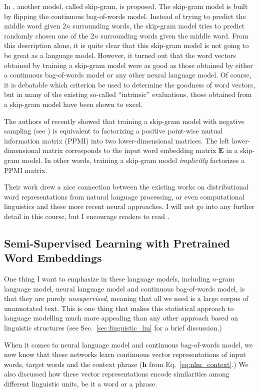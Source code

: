 \documentclass{report}
\newcommand{\vect}[1]{\mathbf{#1}}
\newcommand{\matr}[1]{\mathbf{#1}}
\newcommand{\vh}[0]{\vect{h}}
\newcommand{\mE}[0]{\matr{E}}
\begin{document}
In \cite{mikolov2013efficient}, another model, called skip-gram, is proposed.
The skip-gram model is built by flipping the continuous bag-of-words model.
Instead of trying to predict the middle word given $2n$ surrounding words, the
skip-gram model tries to predict randomly chosen one of the $2n$ surrounding
words given the middle word. From this description alone, it is quite clear that
this skip-gram model is not going to be great as a language model. However, it
turned out that the word vectors obtained by training a skip-gram model were as
good as those obtained by either a continuous bag-of-words model or any other
neural language model. Of course, it is debatable which criterion be used to
determine the goodness of word vectors, but in many of the existing so-called
``intrinsic'' evaluations, those obtained from a skip-gram model have been shown
to excel.

The authors of \cite{Omer2014} recently showed that training a skip-gram model
with negative sampling (see \cite{mikolov2013efficient}) is equivalent to
factorizing a positive point-wise mutual information matrix (PPMI) into two
lower-dimensional matrices. The left lower-dimensional matrix corresponds to the
input word embedding matrix $\mE$ in a skip-gram model. In other words, training
a skip-gram model {\em implicitly} factorizes a PPMI matrix. 

Their work drew a nice connection between the existing works on distributional word
representations from natural language processing, or even computational
linguistics and these more recent neural approaches. I will not go into any
further detail in this course, but I encourage readers to read \cite{Omer2014}.


\subsection{Semi-Supervised Learning with
Pretrained Word Embeddings}

One thing I want to emphasize in these language models, including $n$-gram
language model, neural language model and continuous bag-of-words model, is that
they are purely {\em unsupervised}, meaning that all we need is a large corpus
of unannotated text. This is one thing that makes this statistical approach to
language modelling much more appealing than any other approach based on
linguistic structures (see Sec.~\ref{sec:linguistic_lm} for a brief discussion.) 

When it comes to neural language model and continuous bag-of-words model, we now
know that these networks learn continuous vector representations of input words,
target words and the context phrase ($\vh$ from Eq.~\eqref{eq:nlm_context}.) We
also discussed how these vector representations encode similarities among
different linguistic units, be it a word or a phrase. 
\end{document}
